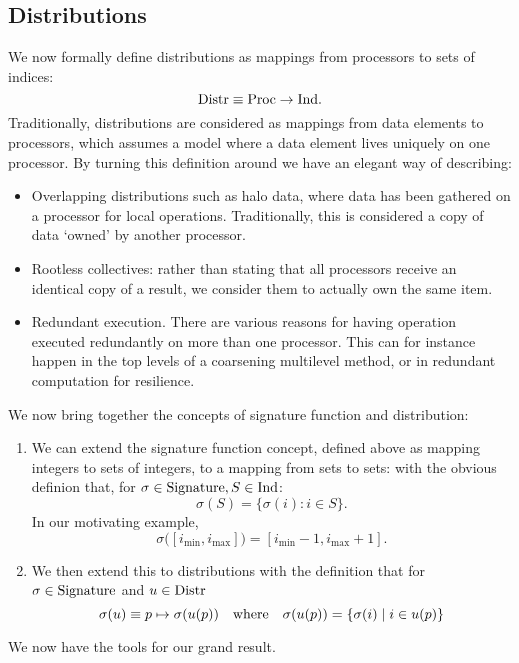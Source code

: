 \subsection{Distributions}

We now formally define distributions as mappings from processors to
sets of indices:
%
\[ \mathord{\mathrm{Distr}}\equiv \mathord{\mathrm{Proc}} \rightarrow \mathord{\mathrm{Ind}}. \]
%
Traditionally, distributions are considered as mappings from data elements 
to processors, which assumes a model where a data element lives uniquely 
on one processor. By turning this definition around we have an elegant way of describing:
\begin{itemize}
\item Overlapping distributions such as halo data, where data has been
  gathered on a processor for local operations. Traditionally, this is
  considered a copy of data `owned' by another processor.
\item Rootless collectives: rather than stating that all processors
  receive an identical copy of a result, we consider them to actually
  own the same item.
\item Redundant execution. There are various reasons for having
  operation executed redundantly on more than one processor. This can
  for instance happen in the top levels of a coarsening multilevel
  method, or in redundant computation
  for resilience. 
\end{itemize}

We now bring together the concepts of signature function and distribution:
\begin{enumerate}
\item We can extend the signature function concept, defined above as
  mapping integers to sets of integers, to a mapping from sets to sets:
%
%
with the obvious definion that, for $\sigma\in\mathord{\mathrm{Signature}},S\in\mathord{\mathrm{Ind}}$:
\[ \sigma(S) = \{ \sigma(i)\colon i\in S \}. \]
In our motivating example,
\[ \sigma\bigl([i_{\min},i_{\max}]\bigr) = [i_{\min}-1,i_{\max}+1]. \]
\item We then extend this to distributions
%
%
with the definition that
for $\sigma\in\mathord{\mathrm{Signature}}$ and $u\in\mathord{\mathrm{Distr}}$
\[ \sigma(u) \equiv p\mapsto \sigma(u(p)) \quad\hbox{where}\quad
   \sigma(u(p)) = \{ \sigma(i)\mid i\in u(p) \}
\]
\end{enumerate}

We now have the tools for our grand result.

